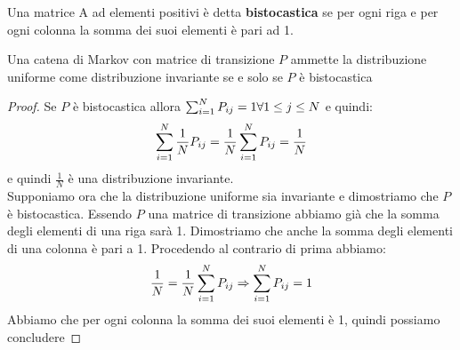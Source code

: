 \begin{defi}
Una matrice A ad elementi positivi è detta \textbf{bistocastica} se per ogni riga e per ogni colonna la somma dei suoi elementi è pari ad 1.
\end{defi}
\begin{teo}
Una catena di Markov con matrice di transizione $P$ ammette la distribuzione uniforme come distribuzione invariante se e solo se $P$ è bistocastica
\end{teo}
\begin{proof}
Se $P$ è bistocastica allora $ \sum_{i=1}^N P_{ij}=1 \forall 1\leq j \leq N$ e quindi:
$$\sum_{i=1}^N \frac{1}{N}P_{ij}=\frac{1}{N}\sum_{i=1}^N P_{ij}=\frac{1}{N}$$
e quindi $\frac{1}{N}$ è una distribuzione invariante.\\
Supponiamo ora che la distribuzione uniforme sia invariante e dimostriamo che $P$ è bistocastica. Essendo $P$ una matrice di transizione abbiamo già che la somma degli elementi di una riga sarà 1. Dimostriamo che anche la somma degli elementi di una colonna è pari a 1. Procedendo al contrario di prima abbiamo:
$$\frac{1}{N}=\frac{1}{N} \sum_{i=1}^N P_{ij} \Rightarrow \sum_{i=1}^N P_{ij}=1$$
Abbiamo che per ogni colonna la somma dei suoi elementi è 1, quindi possiamo concludere
\end{proof}

